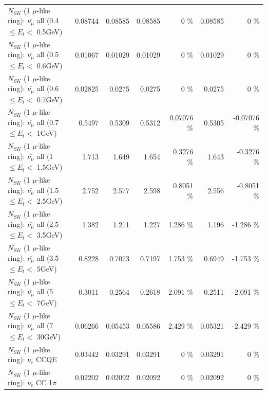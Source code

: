 \begin{table}
\begin{tabular}{| l | r | r | r  r | r  r |}
 $N_{SK}$ (1 $\mu$-like ring): $\bar{\nu_{\mu}}$ all (0.4 $\leq E_{t} <$ 0.5GeV) &         0.08744 &         0.08585 &         0.08585 &        0 \%  &         0.08585 &        0 \%  \\ 
 $N_{SK}$ (1 $\mu$-like ring): $\bar{\nu_{\mu}}$ all (0.5 $\leq E_{t} <$ 0.6GeV) &         0.01067 &         0.01029 &         0.01029 &        0 \%  &         0.01029 &        0 \%  \\ 
 $N_{SK}$ (1 $\mu$-like ring): $\bar{\nu_{\mu}}$ all (0.6 $\leq E_{t} <$ 0.7GeV) &         0.02825 &          0.0275 &          0.0275 &        0 \%  &          0.0275 &        0 \%  \\ 
   $N_{SK}$ (1 $\mu$-like ring): $\bar{\nu_{\mu}}$ all (0.7 $\leq E_{t} <$ 1GeV) &          0.5497 &          0.5309 &          0.5312 &  0.07076 \%  &          0.5305 & -0.07076 \%  \\ 
   $N_{SK}$ (1 $\mu$-like ring): $\bar{\nu_{\mu}}$ all (1 $\leq E_{t} <$ 1.5GeV) &           1.713 &           1.649 &           1.654 &   0.3276 \%  &           1.643 &  -0.3276 \%  \\ 
 $N_{SK}$ (1 $\mu$-like ring): $\bar{\nu_{\mu}}$ all (1.5 $\leq E_{t} <$ 2.5GeV) &           2.752 &           2.577 &           2.598 &   0.8051 \%  &           2.556 &  -0.8051 \%  \\ 
 $N_{SK}$ (1 $\mu$-like ring): $\bar{\nu_{\mu}}$ all (2.5 $\leq E_{t} <$ 3.5GeV) &           1.382 &           1.211 &           1.227 &    1.286 \%  &           1.196 &   -1.286 \%  \\ 
   $N_{SK}$ (1 $\mu$-like ring): $\bar{\nu_{\mu}}$ all (3.5 $\leq E_{t} <$ 5GeV) &          0.8228 &          0.7073 &          0.7197 &    1.753 \%  &          0.6949 &   -1.753 \%  \\ 
     $N_{SK}$ (1 $\mu$-like ring): $\bar{\nu_{\mu}}$ all (5 $\leq E_{t} <$ 7GeV) &          0.3011 &          0.2564 &          0.2618 &    2.091 \%  &          0.2511 &   -2.091 \%  \\ 
    $N_{SK}$ (1 $\mu$-like ring): $\bar{\nu_{\mu}}$ all (7 $\leq E_{t} <$ 30GeV) &         0.06266 &         0.05453 &         0.05586 &    2.429 \%  &         0.05321 &   -2.429 \%  \\ 
\hline
\hline
\hline
                                      $N_{SK}$ (1 $\mu$-like ring): $\nu_e$ CCQE &         0.03442 &         0.03291 &         0.03291 &        0 \%  &         0.03291 &        0 \%  \\ 
                                 $N_{SK}$ (1 $\mu$-like ring): $\nu_e$ CC 1$\pi$ &         0.02202 &         0.02092 &         0.02092 &        0 \%  &         0.02092 &        0 \%  \\ 

\end{tabular}
\end{table}
